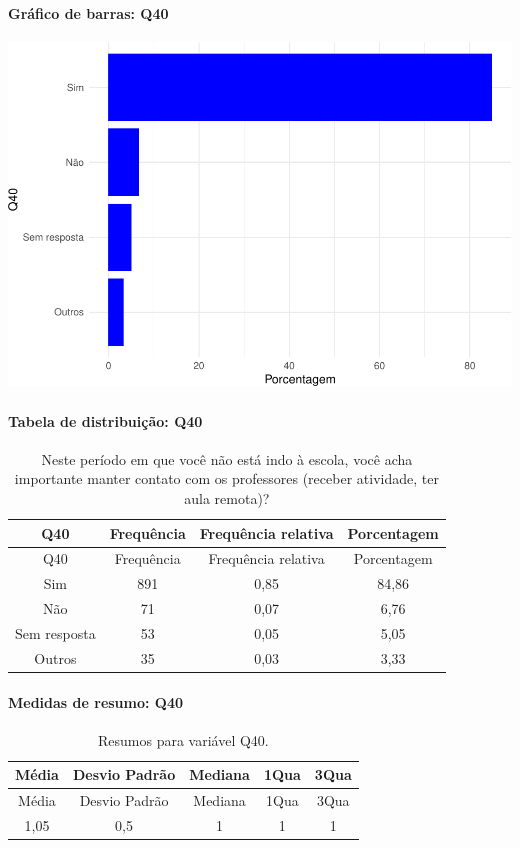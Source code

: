 \documentclass[]{article}
\let\oldparagraph\paragraph
\renewcommand{\paragraph}[1]{\oldparagraph{#1}\mbox{}}
\begin{document}
\hypertarget{gruxe1fico-de-barras-q40}{%
\paragraph{Gráfico de barras: Q40}\label{gruxe1fico-de-barras-q40}}

\begin{center}\includegraphics[width=0.75\linewidth]{relatorio_covid19_files/figure-latex/unnamed-chunk-1544-1} \end{center}

\hypertarget{tabela-de-distribuiuxe7uxe3o-q40}{%
\paragraph{Tabela de distribuição: Q40}\label{tabela-de-distribuiuxe7uxe3o-q40}}

\begin{longtable}[]{@{}cccc@{}}
\caption{\label{tab:unnamed-chunk-1545}Neste período em que você não está indo à escola, você acha importante manter contato com os professores (receber atividade, ter aula remota)?}\tabularnewline
\toprule
Q40 & Frequência & Frequência relativa & Porcentagem\tabularnewline
\midrule
\endfirsthead
\toprule
Q40 & Frequência & Frequência relativa & Porcentagem\tabularnewline
\midrule
\endhead
Sim & 891 & 0,85 & 84,86\tabularnewline
Não & 71 & 0,07 & 6,76\tabularnewline
Sem resposta & 53 & 0,05 & 5,05\tabularnewline
Outros & 35 & 0,03 & 3,33\tabularnewline
\bottomrule
\end{longtable}

\hypertarget{medidas-de-resumo-q40}{%
\paragraph{Medidas de resumo: Q40}\label{medidas-de-resumo-q40}}

\begin{longtable}[]{@{}ccccc@{}}
\caption{\label{tab:unnamed-chunk-1546}Resumos para variável Q40.}\tabularnewline
\toprule
Média & Desvio Padrão & Mediana & 1Qua & 3Qua\tabularnewline
\midrule
\endfirsthead
\toprule
Média & Desvio Padrão & Mediana & 1Qua & 3Qua\tabularnewline
\midrule
\endhead
1,05 & 0,5 & 1 & 1 & 1\tabularnewline
\bottomrule
\end{longtable}
\end{document}

